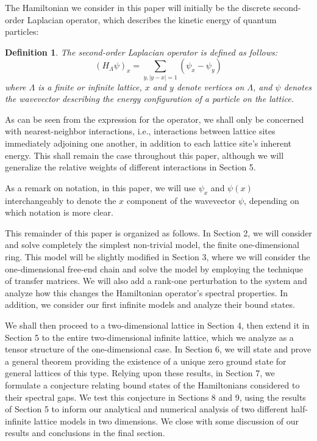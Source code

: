 \documentclass{article}
\newtheorem{definition}{Definition}
\numberwithin{equation}{section}
\numberwithin{theorem}{section}
\numberwithin{proposition}{section}
\numberwithin{lemma}{section}
\numberwithin{corollary}{section}
\numberwithin{definition}{section}
\begin{document}
The Hamiltonian we consider in this paper will initially be the discrete second-order Laplacian operator, which describes the kinetic energy of quantum particles:
\begin{definition}
The second-order Laplacian operator is defined as follows:
	\[
	(H_\Lambda \psi)_x = \sum \limits_{y, |y-x| = 1} (\psi_x - \psi_y)
	\]
where $\Lambda$ is a finite or infinite lattice, $x$ and $y$ denote vertices on $\Lambda$, and $\psi$ denotes the wavevector describing the energy configuration of a particle on the lattice.
\end{definition}

As can be seen from the expression for the operator, we shall only be concerned with nearest-neighbor interactions, i.e., interactions between lattice sites immediately adjoining one another, in addition to each lattice site's inherent energy. This shall remain the case throughout this paper, although we will generalize the relative weights of different interactions in Section 5.

As a remark on notation, in this paper, we will use $\psi_x$ and $\psi(x)$ interchangeably to denote the $x$ component of the wavevector $\psi$, depending on which notation is more clear.

This remainder of this paper is organized as follows. In Section 2, we will consider and solve completely the simplest non-trivial model, the finite one-dimensional ring.  This model will be slightly modified in Section 3, where we will consider the one-dimensional free-end chain and solve the model by employing the technique of transfer matrices.  We will also add a rank-one perturbation to the system and analyze how this changes the Hamiltonian operator's spectral properties. In addition, we consider our first infinite models and analyze their bound states.

We shall then proceed to a two-dimensional lattice in Section 4, then extend it in Section 5 to the entire two-dimensional infinite lattice, which we analyze as a tensor structure of the one-dimensional case. In Section 6, we will state and prove a general theorem providing the existence of a unique zero ground state for general lattices of this type. Relying upon these results, in Section 7, we formulate a conjecture relating bound states of the Hamiltonians considered to their spectral gaps. We test this conjecture in Sections 8 and 9, using the results of Section 5 to inform our analytical and numerical analysis of two different half-infinite lattice models in two dimensions. We close with some discussion of our results and conclusions in the final section.
\end{document}
